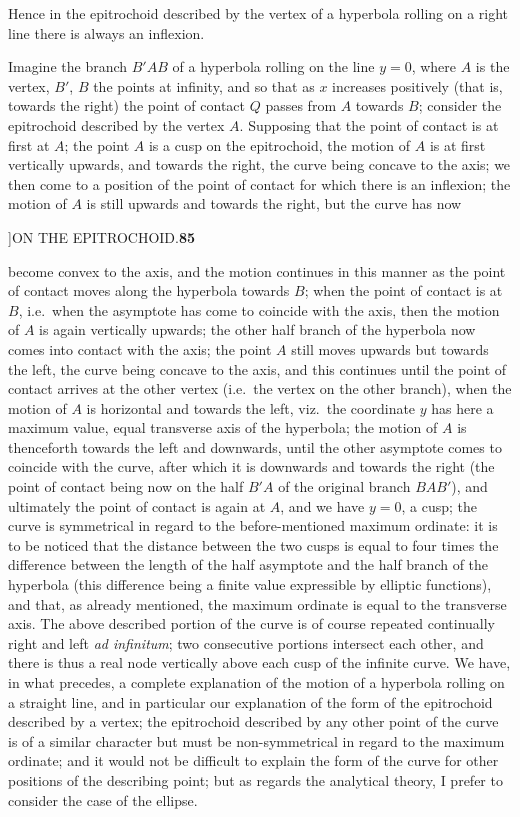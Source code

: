 \documentclass[11pt]{article}
\begin{document}
\hspace{1em} Hence in the epitrochoid described by the vertex of a hyperbola
rolling on a right line there is always an inflexion.

\hspace{1em} Imagine the branch $B'AB$ of a hyperbola rolling on the line
$y=0$, where $A$ is the vertex, $B'$, $B$ the points at infinity, and so that
as $x$ increases positively (that is, towards the right) the point of contact
$Q$ passes from $A$ towards $B$; consider the epitrochoid described by the
vertex $A$. Supposing that the point of contact is at first at $A$; the point
$A$ is a cusp on the epitrochoid, the motion of $A$ is at first vertically
upwards, and towards the right, the curve being concave to the axis; we then
come to a position of the point of contact for which there is an inflexion;
the motion of $A$ is still upwards and towards the right, but the curve has now

\newpage
{}]\hfill ON THE EPITROCHOID.\hfill\textbf{85}

\smallskip
become convex to the axis, and the motion continues in this manner as the
point of contact moves along the hyperbola towards $B$; when the point of
contact is at $B$, i.e.\ when the asymptote has come to coincide with the
axis, then the motion of $A$ is again vertically upwards; the other half
branch of the hyperbola now comes into contact with the axis; the point $A$
still moves upwards but towards the left, the curve being concave to the
axis, and this continues until the point of contact arrives at the other
vertex (i.e.\ the vertex on the other branch), when the motion of $A$ is
horizontal and towards the left, viz.\ the coordinate $y$ has here a maximum
value, equal transverse axis of the hyperbola; the motion of $A$ is
thenceforth towards the left and downwards, until the other asymptote comes
to coincide with the curve, after which it is downwards and towards the right
(the point of contact being now on the half $B'A$ of the original branch
$BAB'$), and ultimately the point of contact is again at $A$, and we have
$y=0$, a cusp; the curve is symmetrical in regard to the before-mentioned
maximum ordinate: it is to be noticed that the distance between the two cusps
is equal to four times the difference between the length of the half
asymptote and the half branch of the hyperbola (this difference being a
finite value expressible by elliptic functions), and that, as already
mentioned, the maximum ordinate is equal to the transverse axis. The above
described portion of the curve is of course repeated continually right and
left \emph{ad infinitum}; two consecutive portions intersect each other, and
there is thus a real node vertically above each cusp of the infinite curve.
We have, in what precedes, a complete explanation of the motion of a
hyperbola rolling on a straight line, and in particular our explanation of
the form of the epitrochoid described by a vertex; the epitrochoid described
by any other point of the curve is of a similar character but must be
non-symmetrical in regard to the maximum ordinate; and it would not be
difficult to explain the form of the curve for other positions of the
describing point; but as regards the analytical theory, I prefer to consider
the case of the ellipse.
\end{document}
